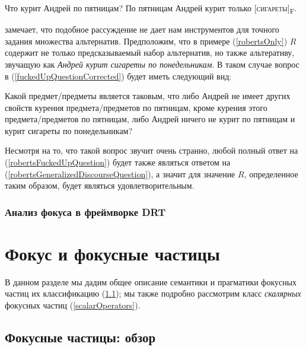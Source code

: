\documentclass[a4paper, titlepage, 12pt]{article}
\begin{document}
\begin{exe}
    \ex \label{robertsGeneralizedDiscourse} \begin{xlist}
            \ex \label{robertsGeneralizedDiscourseQuestion} Что курит Андрей по пятницам?
            \ex \label{robertsGeneralizedDiscourseAnswer} По пятницам Андрей курит только [\textsc{сигареты}]\textsubscript{F}.
    \end{xlist}
\end{exe}

\citep{kadmon2001formal} замечает, что подобное рассуждение не дает нам инструментов для точного задания множества альтернатив. Предположим, что в примере (\ref{robertsOnly}) $ R $ содержит не только предсказываемый \citep{roberts1996information} набор альтернатив, но также альтеративу, звучащую как \textit{Андрей курит сигареты по понедельникам}. В таком случае вопрос в (\ref{fuckedUpQuestionCorrected}) будет иметь следующий вид:

\begin{exe}
    \ex \label{robertsFuckedUpQuestion} Какой предмет/предметы является таковым, что либо Андрей не имеет других свойств курения предмета/предметов по пятницам, кроме курения этого предмета/предметов по пятницам, либо Андрей ничего не курит по пятницам и курит сигареты по понедельникам?
\end{exe}

Несмотря на то, что такой вопрос звучит очень странно, любой полный ответ на (\ref{robertsFuckedUpQuestion}) будет также являться ответом на (\ref{robertsGeneralizedDiscourseQuestion}), а значит для \citep{roberts1996information} значение $ R $, определенное таким образом, будет являться удовлетворительным.

\subsubsection{Анализ фокуса в фреймворке DRT \citep{geurts2004interpreting}}

\section{Фокус и фокусные частицы}

В данном разделе мы дадим общее описание семантики и прагматики фокусных частиц их классификацию (\ref{focusParticles}); мы также подробно рассмотрим класс \textit{скалярных} фокусных частиц (\ref{scalarOperators}).

\subsection{Фокусные частицы: обзор} \label{focusParticles}
\end{document}
